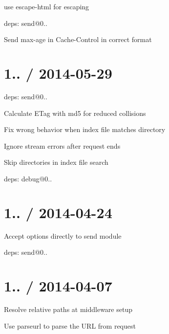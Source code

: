 \begin{DoxyItemize}
\item use {\ttfamily escape-\/html} for escaping
\item deps\+: send@0..
\begin{DoxyItemize}
\item Send {\ttfamily max-\/age} in {\ttfamily Cache-\/\+Control} in correct format
\end{DoxyItemize}
\end{DoxyItemize}

\section*{1.. / 2014-\/05-\/29 }


\begin{DoxyItemize}
\item deps\+: send@0..
\begin{DoxyItemize}
\item Calculate E\+Tag with md5 for reduced collisions
\item Fix wrong behavior when index file matches directory
\item Ignore stream errors after request ends
\item Skip directories in index file search
\item deps\+: debug@0..
\end{DoxyItemize}
\end{DoxyItemize}

\section*{1.. / 2014-\/04-\/24 }


\begin{DoxyItemize}
\item Accept options directly to {\ttfamily send} module
\item deps\+: send@0..
\end{DoxyItemize}

\section*{1.. / 2014-\/04-\/07 }


\begin{DoxyItemize}
\item Resolve relative paths at middleware setup
\item Use parseurl to parse the U\+RL from request
\end{DoxyItemize}

